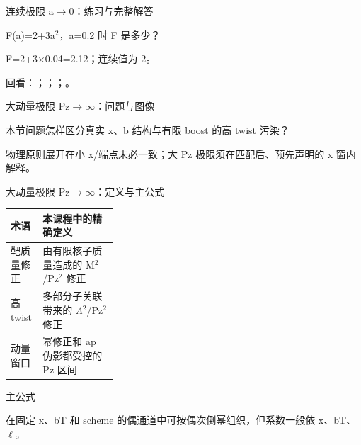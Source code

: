 \begin{frame}[t]{连续极限 a\ensuremath{\rightarrow}0：练习与完整解答}
\footnotesize
\begin{block}{}F(a)=2+3a\ensuremath{^{2}}，a=0.2 时 F 是多少？\end{block}
\begin{exampleblock}{}F=2+3\ensuremath{\times}0.04=2.12；连续值为 2。\end{exampleblock}
\vfill
\scriptsize 回看：；；；。
\end{frame}

\begin{frame}[t]{大动量极限 Pz\ensuremath{\rightarrow}\ensuremath{\infty}：问题与图像}
\footnotesize
\begin{block}{本节问题}怎样区分真实 x、b 结构与有限 boost 的高 twist 污染？\end{block}
\begin{block}{物理原则}\quad 展开在小 x/\allowbreak{}端点未必一致；大 Pz 极限须在匹配后、预先声明的 x 窗内解释。\end{block}
\end{frame}

\begin{frame}[t]{大动量极限 Pz\ensuremath{\rightarrow}\ensuremath{\infty}：定义与主公式}
\footnotesize\begin{tabularx}{\linewidth}{p{0.30\linewidth}Y}
\toprule 术语 & 本课程中的精确定义\\\midrule
{} 靶质量修正 & 由有限核子质量造成的 M\ensuremath{^{2}}/\allowbreak{}Pz\ensuremath{^{2}} 修正\\
 高 twist & 多部分子关联带来的 \ensuremath{\Lambda}\ensuremath{^{2}}/\allowbreak{}Pz\ensuremath{^{2}} 修正\\
 动量窗口 & 幂修正和 ap 伪影都受控的 Pz 区间\\
\bottomrule\end{tabularx}\vspace{0.15cm}
\begin{block}{ 主公式}\centering{}\end{block}
在固定 x、bT 和 scheme 的偶通道中可按偶次倒幂组织，但系数一般依 x、bT、\ensuremath{\ell}。
\end{frame}

